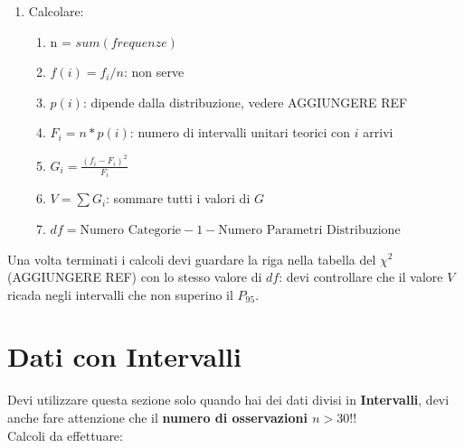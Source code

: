 \begin{enumerate}
\begin{itemize}
\begin{figure}[H]
                    \end{figure}
          \end{itemize}
    \item Calcolare:
          \begin{enumerate}
              \item n = $sum(frequenze)$
              \item $f(i) = f_i / n$: non serve %
              \item $p(i)$: dipende dalla distribuzione, vedere AGGIUNGERE REF
              \item $F_i = n * p(i)$: numero di intervalli unitari teorici con
                    $i$ arrivi
              \item $G_i = \frac{(f_i - F_i)^2}{F_i}$
              \item $V = \sum G_i$: sommare tutti i valori di $G$
              \item $df = \text{Numero Categorie} - 1 - \text{Numero Parametri
                            Distribuzione}$
          \end{enumerate}
\end{enumerate}

Una volta terminati i calcoli devi guardare la riga nella tabella del $\chi^2$
(AGGIUNGERE REF) con lo stesso valore di $df$: devi controllare che il valore
$V$ ricada negli intervalli che non superino il $P_{95}$.

\section{Dati con Intervalli}

Devi utilizzare questa sezione solo quando hai dei dati
divisi in \textbf{Intervalli},
devi anche fare attenzione che il \textbf{numero di osservazioni $n > 30$}!!\\

Calcoli da effettuare:

